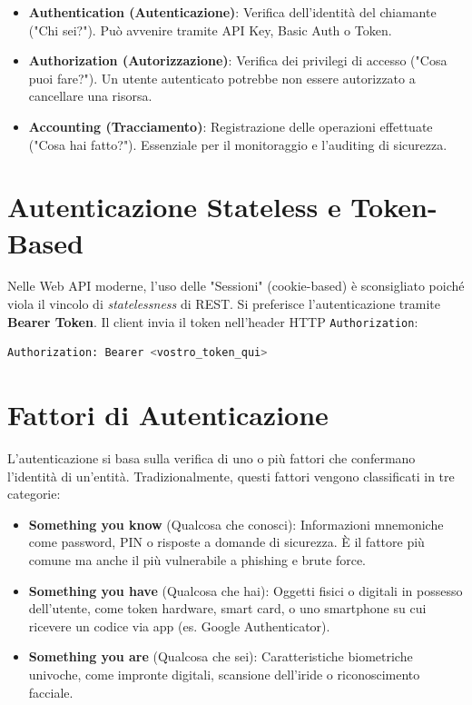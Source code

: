 \documentclass[11pt,a4paper]{report}
\begin{document}
\begin{itemize}[leftmargin=3em]
    \item \textbf{Authentication (Autenticazione)}: Verifica dell'identità del chiamante ("Chi sei?"). Può avvenire tramite API Key, Basic Auth o Token.
    \item \textbf{Authorization (Autorizzazione)}: Verifica dei privilegi di accesso ("Cosa puoi fare?"). Un utente autenticato potrebbe non essere autorizzato a cancellare una risorsa.
    \item \textbf{Accounting (Tracciamento)}: Registrazione delle operazioni effettuate ("Cosa hai fatto?"). Essenziale per il monitoraggio e l'auditing di sicurezza.
\end{itemize}

\section{Autenticazione Stateless e Token-Based}
Nelle Web API moderne, l'uso delle "Sessioni" (cookie-based) è sconsigliato poich\'e viola il vincolo di \textit{statelessness} di REST. Si preferisce l'autenticazione tramite \textbf{Bearer Token}. Il client invia il token nell'header HTTP \texttt{Authorization}:

\begin{lstlisting}[language=bash]
Authorization: Bearer <vostro_token_qui>
\end{lstlisting}

\section{Fattori di Autenticazione}
L'autenticazione si basa sulla verifica di uno o più fattori che confermano l'identità di un'entità. Tradizionalmente, questi fattori vengono classificati in tre categorie:

\begin{itemize}[leftmargin=3em]
    \item \textbf{Something you know} (Qualcosa che conosci): Informazioni mnemoniche come password, PIN o risposte a domande di sicurezza. \`E il fattore più comune ma anche il più vulnerabile a phishing e brute force.
    \item \textbf{Something you have} (Qualcosa che hai): Oggetti fisici o digitali in possesso dell'utente, come token hardware, smart card, o uno smartphone su cui ricevere un codice via app (es. Google Authenticator).
    \item \textbf{Something you are} (Qualcosa che sei): Caratteristiche biometriche univoche, come impronte digitali, scansione dell'iride o riconoscimento facciale.
\end{itemize}
\end{document}
